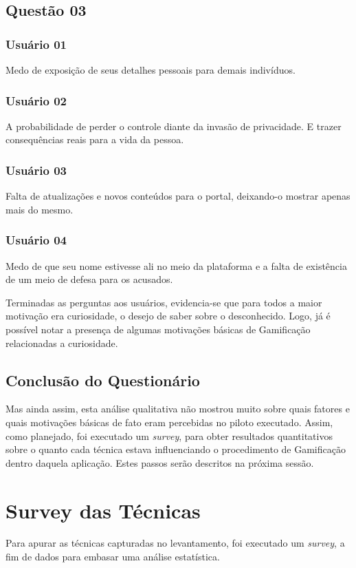 \subsection{Questão 03}
\subsubsection{Usuário 01}
Medo de exposição de seus detalhes pessoais para demais indivíduos.
\subsubsection{Usuário 02}
A probabilidade de perder o controle diante da invasão de privacidade. E trazer
consequências reais para a vida da pessoa.
\subsubsection{Usuário 03}
Falta de atualizações e novos conteúdos para o portal, deixando-o mostrar apenas mais do mesmo.
\subsubsection{Usuário 04}
Medo de que seu nome estivesse ali no meio da plataforma e a falta de existência
de um meio de defesa para os acusados.

Terminadas as perguntas aos usuários, evidencia-se que para todos a maior motivação era curiosidade, o desejo de saber sobre o desconhecido. Logo, já é possível notar a presença de algumas motivações básicas de Gamificação relacionadas a curiosidade.

\subsection{Conclusão do Questionário}
Mas ainda assim, esta análise qualitativa não mostrou muito sobre quais fatores
e quais motivações básicas de fato eram percebidas no piloto executado. Assim,
como planejado, foi executado um \textit{survey}, para obter resultados quantitativos sobre
o quanto cada técnica estava influenciando o procedimento de Gamificação dentro
daquela aplicação. Estes passos serão descritos na próxima sessão.

\section{Survey das Técnicas}
\label{sec:gamifição}
Para apurar as técnicas capturadas no levantamento, foi executado um \textit{survey}, a fim de dados para
embasar uma análise estatística.

